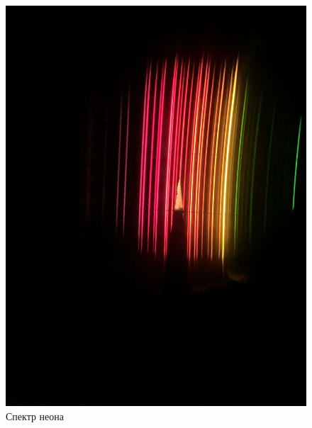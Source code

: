 \documentclass[a4paper, 12pt]{article}%
\begin{document}
\begin{enumerate}
\newpage
	
	\begin{figure}[h!]
		\centering
		\includegraphics[angle=-90,  scale=0.075]{Спектр_неона.PNG}
		\caption{Спектр неона}
	\end{figure}
	

\end{enumerate}
\end{document}

